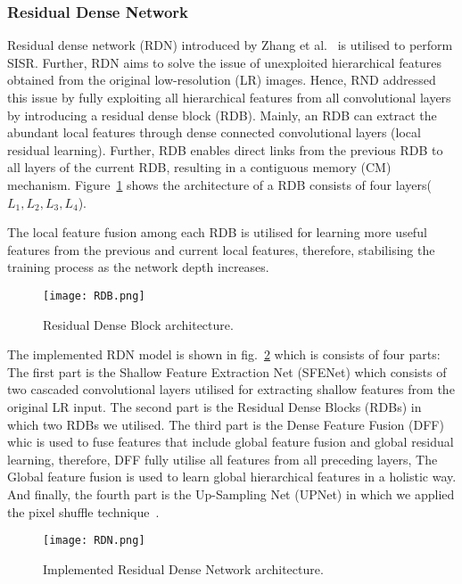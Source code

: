 \subsubsection{Residual Dense Network}
Residual dense network (RDN) introduced by Zhang et al.~\cite{Zhang2018} is utilised to perform SISR.
Further, RDN aims to solve the issue of unexploited hierarchical features obtained from the original low-resolution (LR) images.
Hence, RND addressed this issue by fully exploiting all hierarchical features from all convolutional layers by introducing a residual dense block (RDB).
Mainly, an RDB can extract the abundant local features through dense connected convolutional layers (local residual learning).
Further, RDB enables direct links from the previous RDB to all layers of the current RDB, resulting in a contiguous memory (CM) mechanism.
Figure~\ref{fig:RDB} shows the architecture of a RDB consists of four layers(\(L_1, L_2,L_3,L_4\)).

The local feature fusion among each RDB is utilised for learning more useful features from the previous and current local features, therefore, stabilising the training process as the network depth increases.
\begin{figure} [h!]
	\begin{center}
		\texttt{[image: RDB.png]}
	\end{center}
	\caption{Residual Dense Block architecture.} 
	\label{fig:RDB}
\end{figure}

The implemented RDN model is shown in fig.~\ref{fig:RDN} which is consists of four parts:
The first part is the Shallow Feature Extraction Net (SFENet) which consists of two cascaded convolutional layers utilised for extracting shallow features from the original LR input.
The second part is the Residual Dense Blocks (RDBs) in which two RDBs we utilised.
The third part is the Dense Feature Fusion (DFF) whic is used to fuse features that include global feature fusion and global residual learning, therefore, DFF fully utilise all features from all preceding layers,
The Global feature fusion is used to learn global hierarchical features in a holistic way.
And finally, the fourth part is the Up-Sampling Net (UPNet) in which we applied the pixel shuffle technique~\cite{Shi2016}.

\begin{figure} [h!]
	\begin{center}
		\texttt{[image: RDN.png]}
	\end{center}
	\caption{Implemented Residual Dense Network architecture.} 
	\label{fig:RDN}
\end{figure}

